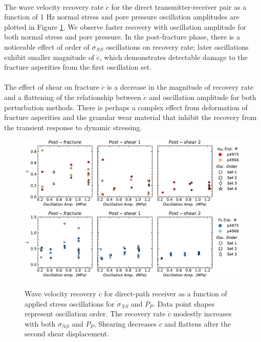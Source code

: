 \documentclass[letterpaper,10pt]{article}
\begin{document}
\paragraph{}
The wave velocity recovery rate $ \dot c $ for the direct transmitter-receiver pair as a function of 1 Hz normal stress and pore pressure oscillation amplitudes are plotted in Figure \ref{fig:c_recov}. We observe faster recovery with oscillation amplitude for both normal stress and pore pressure. In the post-fracture phase, there is a noticeable effect of order of $ \sigma_{NS} $ oscillations on recovery rate; later oscillations exhibit smaller magnitude of $ \dot c$, which demonstrates detectable damage to the fracture asperities from the first oscillation set.  

\paragraph{}
The effect of shear on fracture $ \dot c $ is a decrease in the magnitude of recovery rate and a flattening of the relationship between $ \dot c $ and oscillation amplitude for both perturbation methods. There is perhaps a complex effect from deformation of fracture asperities and the granular wear material that inhibit the recovery from the transient response to dynamic stressing.  

\clearpage

\begin{figure}[ht]
	\centering
	\includegraphics[width=1\columnwidth]{c_recov_amp_NS}
	\includegraphics[width=1\columnwidth]{c_recov_amp_PP}
	\caption{Wave velocity recovery $ \dot c $ for direct-path receiver as a function of applied stress oscillations for $ \sigma_{NS} $ and $ P_P $. Data point shapes represent oscillation order. The recovery rate $ \dot c $ modestly increases with both $ \sigma_{NS} $ and $ P_P $. Shearing decreases $ \dot c $ and flattens after the second shear displacement. }
	\label{fig:c_recov}
\end{figure}
\end{document}
